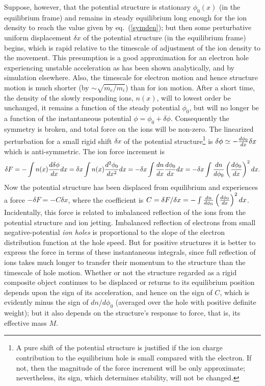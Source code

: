 \documentclass[pre]{revtex4-2}
\begin{document}
Suppose, however, that the potential structure is stationary
$\phi_0(x)$ (in the equilibrium frame) and remains in steady
equilibrium long enough for the ion density to reach the value given
by eq.\ (\ref{symden}); but then some perturbative uniform
displacement $\delta x$ of the potential structure (in the equilibrium
frame) begins, which is rapid relative to the timescale of adjustment
of the ion density to the movement. This presumption is a good
approximation for an electron hole experiencing unstable acceleration
as has been shown analytically\cite{Hutchinson2016}, and by
simulation\cite{Zhou2016} elsewhere.  Also, the timescale for electron
motion and hence structure motion is much shorter (by
$\sim \sqrt{m_e/m_i}$) than for ion motion. After a short time, the
density of the slowly responding ions, $n(x)$, will to lowest order be
unchanged, it remains a function of the steady potential $\phi_0$, but
will no longer be a function of the instantaneous potential
$\phi=\phi_0+\delta\phi$. Consequently the symmetry is broken, and
total force on the ions will be non-zero.  The linearized perturbation
for a small rigid shift $\delta x$ of the potential
structure\footnote{A pure shift of the potential structure is
  justified if the ion charge contribution to the equilibrium hole is
  small compared with the electron. If not, then the magnitude of the
  force increment will be only approximate; nevertheless, its sign,
  which determines stability, will not be changed.} is
$\delta\phi\simeq-{d\phi_0\over dx}\delta x$ which is
anti-symmetric. The ion force increment is
\begin{equation}
  \delta F = -\int n(x) {d\delta\phi\over dx} dx 
  =\delta x \int n(x) {d^2\phi_0\over dx^2} dx 
  =-\delta x \int {dn\over dx} {d\phi_0\over dx} dx
  =-\delta x \int{dn\over d\phi_0}\left(d\phi_0 \over dx\right)^2 dx.
\end{equation}
Now the potential structure has been displaced from equilibrium and
experiences a force $-\delta F= -C \delta x$, where the coefficient is
$C=\delta F/\delta x=-\int{dn\over d\phi_0}\left(d\phi_0 \over
  dx\right)^2 dx$. Incidentally, this force is related to imbalanced
reflection of the ions from the potential structure and ion
jetting. Imbalanced reflection of electrons from small
negative-potential \emph{ion holes} is proportional to the slope of the
electron distribution function at the hole speed\cite{Dupree1983}. But
for positive structures it is better to express the force in terms of
these instantaneous integrals, since full reflection of ions takes
much longer to transfer their momentum to the structure than the
timescale of hole motion. Whether or not the structure regarded as a
rigid composite object continues to be displaced or returns to its
equilibrium position depends upon the sign of its acceleration, and
hence on the sign of $C$, which is evidently minus the sign of
$dn/d\phi_0$ (averaged over the hole with positive definite weight);
but it also depends on the structure's response to force, that is, its
effective mass $M$.
\end{document}
